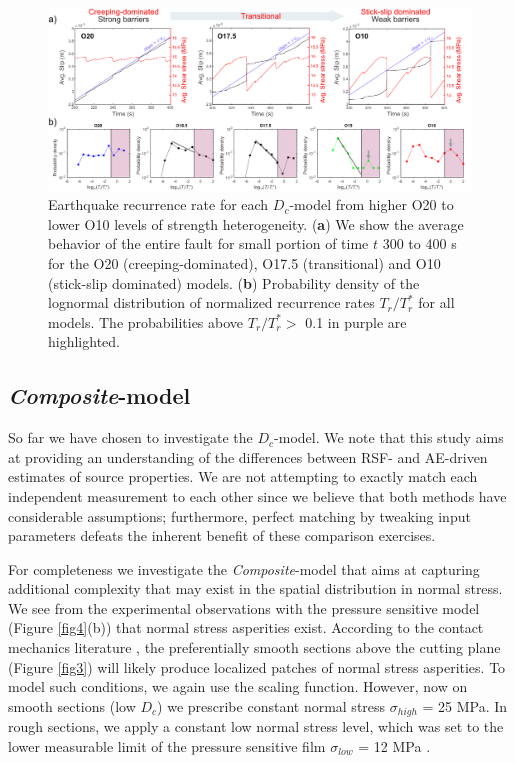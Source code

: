 \documentclass[final,3p, 11pt,authoryear]{elsarticle}
\begin{document}
\begin{figure}
    	\centering
	\includegraphics[scale = 0.9]{FIG11.pdf} 
	\caption{Earthquake recurrence rate for each $D_{c}$-model from higher O20 to lower O10 levels of strength heterogeneity. (\textbf{a}) We show the average behavior of the entire fault for small portion of time $t$ 300 to 400 s for the O20 (creeping-dominated), O17.5 (transitional) and O10 (stick-slip dominated) models. (\textbf{b}) Probability density of the lognormal distribution of normalized recurrence rates $T_{r}/T^{*}_{r}$ for all models. The probabilities above $T_{r}/T^{*}_{r} >$ 0.1 in purple are highlighted.}
	\label{fig11}
\end{figure}
\subsection{\textit{Composite}-model}
So far we have chosen to investigate the $D_{c}$-model. We note that this study aims at providing an understanding of the differences between RSF- and AE-driven estimates of source properties. We are not attempting to exactly match each independent measurement to each other since we believe that both methods have considerable assumptions; furthermore, perfect matching by tweaking input parameters defeats the inherent benefit of these comparison exercises.

For completeness we investigate the \textit{Composite}-model that aims at capturing additional complexity that may exist in the spatial distribution in normal stress. We see from the experimental observations with the pressure sensitive model (Figure \ref{fig4}(b)) that normal stress asperities exist. According to the contact mechanics literature \citep{Nayak1971, Nayak1973}, the preferentially smooth sections above the cutting plane (Figure \ref{fig3}) will likely produce localized patches of normal stress asperities. To model such conditions, we again use the scaling function. However, now on smooth sections (low $D_{c}$) we prescribe constant normal stress $\sigma_{high}$ = 25 MPa.  In rough sections, we apply a constant low normal stress level, which was set to the lower measurable limit of the pressure sensitive film $\sigma_{low}$ = 12 MPa \citep{Selvadurai2015a}. 
\end{document}

